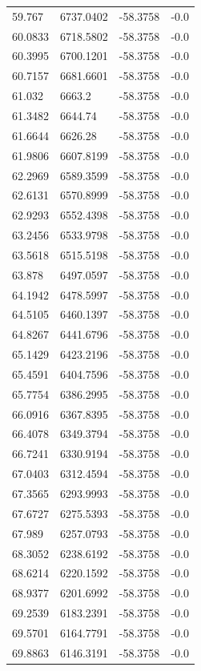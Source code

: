 \begin{table}[H]
\begin{tabular}{llll}
59.767 & 6737.0402 & -58.3758 & -0.0 \\
60.0833 & 6718.5802 & -58.3758 & -0.0 \\
60.3995 & 6700.1201 & -58.3758 & -0.0 \\
60.7157 & 6681.6601 & -58.3758 & -0.0 \\
61.032 & 6663.2 & -58.3758 & -0.0 \\
61.3482 & 6644.74 & -58.3758 & -0.0 \\
61.6644 & 6626.28 & -58.3758 & -0.0 \\
61.9806 & 6607.8199 & -58.3758 & -0.0 \\
62.2969 & 6589.3599 & -58.3758 & -0.0 \\
62.6131 & 6570.8999 & -58.3758 & -0.0 \\
62.9293 & 6552.4398 & -58.3758 & -0.0 \\
63.2456 & 6533.9798 & -58.3758 & -0.0 \\
63.5618 & 6515.5198 & -58.3758 & -0.0 \\
63.878 & 6497.0597 & -58.3758 & -0.0 \\
64.1942 & 6478.5997 & -58.3758 & -0.0 \\
64.5105 & 6460.1397 & -58.3758 & -0.0 \\
64.8267 & 6441.6796 & -58.3758 & -0.0 \\
65.1429 & 6423.2196 & -58.3758 & -0.0 \\
65.4591 & 6404.7596 & -58.3758 & -0.0 \\
65.7754 & 6386.2995 & -58.3758 & -0.0 \\
66.0916 & 6367.8395 & -58.3758 & -0.0 \\
66.4078 & 6349.3794 & -58.3758 & -0.0 \\
66.7241 & 6330.9194 & -58.3758 & -0.0 \\
67.0403 & 6312.4594 & -58.3758 & -0.0 \\
67.3565 & 6293.9993 & -58.3758 & -0.0 \\
67.6727 & 6275.5393 & -58.3758 & -0.0 \\
67.989 & 6257.0793 & -58.3758 & -0.0 \\
68.3052 & 6238.6192 & -58.3758 & -0.0 \\
68.6214 & 6220.1592 & -58.3758 & -0.0 \\
68.9377 & 6201.6992 & -58.3758 & -0.0 \\
69.2539 & 6183.2391 & -58.3758 & -0.0 \\
69.5701 & 6164.7791 & -58.3758 & -0.0 \\
69.8863 & 6146.3191 & -58.3758 & -0.0 \\

\end{tabular}
\end{table}
